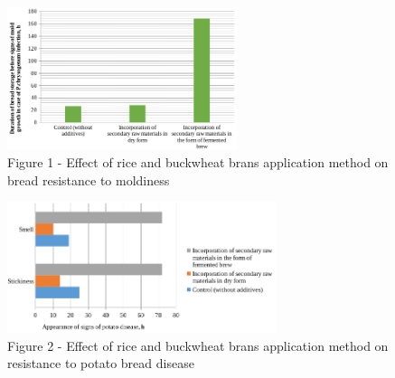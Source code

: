 \begin{figure}[H]
	\centering
	\includegraphics[width=0.6\textwidth]{assets/1108}
    \caption*{Figure 1 - Effect of rice and buckwheat brans application method on bread resistance to moldiness}
\end{figure}

\begin{figure}[H]
	\centering
	\includegraphics[width=0.7\textwidth]{assets/1109}
    \caption*{Figure 2 - Effect of rice and buckwheat brans application method on resistance to potato bread disease}
\end{figure}

